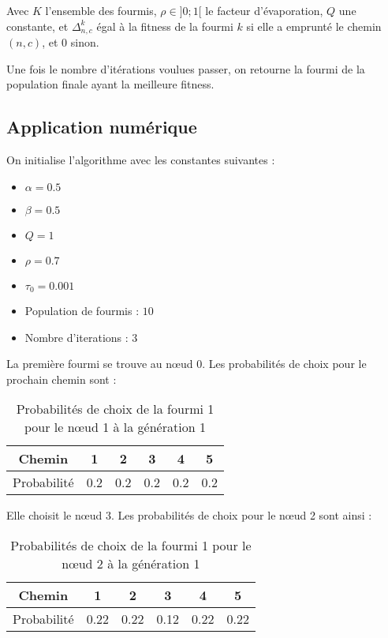 Avec $K$ l'ensemble des fourmis, $\rho \in ]0;1[$ le facteur d'évaporation, $Q$ une constante, et $\Delta^k_{n,c}$ égal à la fitness de la fourmi $k$ si elle a emprunté le chemin $(n,c)$, et $0$ sinon.

Une fois le nombre d'itérations voulues passer, on retourne la fourmi de la population finale ayant la meilleure fitness.

\newpage
\subsection{Application numérique}\label{subsec:application-numerique}

On initialise l'algorithme avec les constantes suivantes :

\begin{itemize}
    \item $\alpha = 0.5$
    \item $\beta = 0.5$
    \item $Q = 1$
    \item $\rho = 0.7$
    \item $\tau_0 = 0.001$
    \item Population de fourmis : $10$
    \item Nombre d'iterations : $3$
\end{itemize}

La première fourmi se trouve au n\oe ud $0$.
Les probabilités de choix pour le prochain chemin sont :


\begin{table}[h!]
    \centering
    \begin{tabular}{|c|c|c|c|c|c|}
        \hline
        Chemin      & 1   & 2   & 3   & 4   & 5   \\
        \hline
        Probabilité & 0.2 & 0.2 & 0.2 & 0.2 & 0.2 \\
        \hline
    \end{tabular}
    \caption{Probabilités de choix de la fourmi 1 pour le n\oe ud 1 à la génération 1}\label{tab:fourmi-1-noeud-1-gen-1}
\end{table}

Elle choisit le n\oe ud $3$.
Les probabilités de choix pour le n\oe ud 2 sont ainsi :

\begin{table}[h!]
    \centering
    \begin{tabular}{|c|c|c|c|c|c|}
        \hline
        Chemin      & 1    & 2    & 3    & 4    & 5    \\
        \hline
        Probabilité & 0.22 & 0.22 & 0.12 & 0.22 & 0.22 \\
        \hline
    \end{tabular}
    \caption{Probabilités de choix de la fourmi 1 pour le n\oe ud 2 à la génération 1}\label{tab:fourmi-1-noeud-2-gen-1}
\end{table}

